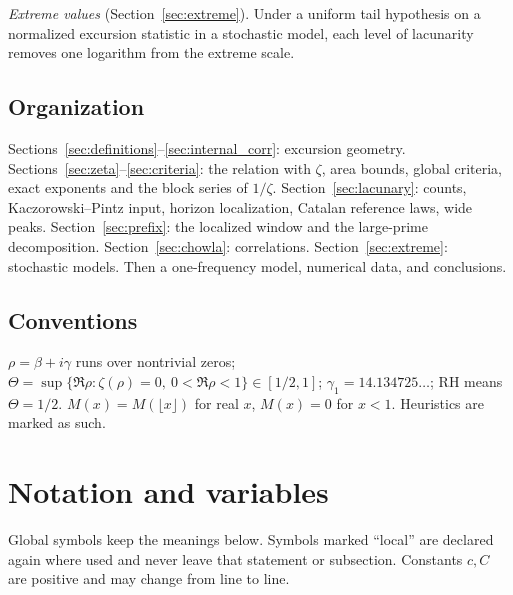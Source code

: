 \documentclass[11pt]{amsart}
\numberwithin{equation}{section}
\theoremstyle{plain}
\theoremstyle{definition}
\theoremstyle{remark}
\begin{document}
\emph{Extreme values} (Section~\ref{sec:extreme}). Under a uniform tail
hypothesis on a normalized excursion statistic in a stochastic model, each
level of lacunarity removes one logarithm from the extreme scale.

\subsection{Organization}
\label{subsec:organization}
Sections~\ref{sec:definitions}--\ref{sec:internal_corr}: excursion geometry.
Sections~\ref{sec:zeta}--\ref{sec:criteria}: the relation with $\zeta$, area
bounds, global criteria, exact exponents and the block series of $1/\zeta$.
Section~\ref{sec:lacunary}: counts, Kaczorowski--Pintz input, horizon
localization, Catalan reference laws, wide peaks.
Section~\ref{sec:prefix}: the localized window and the large-prime
decomposition. Section~\ref{sec:chowla}: correlations.
Section~\ref{sec:extreme}: stochastic models. Then a one-frequency model,
numerical data, and conclusions.

\subsection*{Conventions}
$\rho=\beta+i\gamma$ runs over nontrivial zeros;
$\Theta=\sup\{\Re\rho:\zeta(\rho)=0,\ 0<\Re\rho<1\}\in[1/2,1]$;
$\gamma_1=14.134725\ldots$; RH means $\Theta=1/2$. $M(x)=M(\lfloor x\rfloor)$
for real $x$, $M(x)=0$ for $x<1$. Heuristics are marked as such.

\section{Notation and variables}
\label{sec:notation}

Global symbols keep the meanings below. Symbols marked ``local'' are
declared again where used and never leave that statement or subsection.
Constants $c,C$ are positive and may change from line to line.
\end{document}
